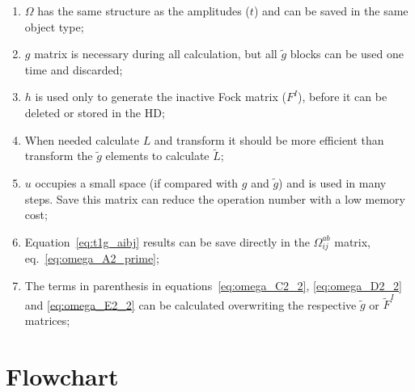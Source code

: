 \begin{enumerate}
\item{}$\Omega$ has the same structure as the amplitudes ($t$) and can be saved in the same object type;
\item{}$g$ matrix is necessary during all calculation, but all $\tilde g$ blocks can be used one time and discarded;
\item{}$h$ is used only to generate the inactive Fock matrix ($F^I$), before it can be deleted or stored in the HD;
\item{}When needed calculate $L$ and transform it should be more efficient than transform the $\tilde g$ elements to calculate $\tilde L$;
\item{}$u$ occupies a small space (if compared with $g$ and $\tilde g$) and is used in many steps. Save this matrix can reduce the operation number with a low memory cost;
\item{}Equation~\ref{eq:t1g_aibj} results can be save directly in the $\Omega_{ij}^{ab}$ matrix, eq.~\ref{eq:omega_A2_prime};
\item{}The terms in parenthesis in equations~\ref{eq:omega_C2_2}, \ref{eq:omega_D2_2} and \ref{eq:omega_E2_2} can be calculated overwriting the respective $\tilde g$ or $\tilde F^I$ matrices;
\end{enumerate}

\newpage
\section{Flowchart}
\label{sec:ccsd_flowchart}




